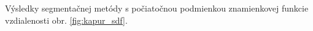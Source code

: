 \documentclass[a4paper,11pt,oneside]{article}%
\begin{document}
Výsledky segmentačnej metódy s počiatočnou podmienkou znamienkovej funkcie vzdialenosti obr. \ref{fig:kapur_sdf}.


\begin{figure}[H]  
    \hspace{5px}

\end{figure}
\end{document}
